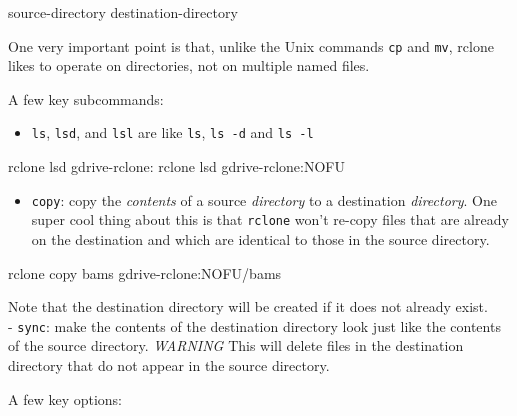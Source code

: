 \documentclass[]{krantz}
\makeatletter
\newenvironment{Shaded}{\begin{snugshade}}{\end{snugshade}}
\newcommand{\ExtensionTok}[1]{#1}
\newcommand{\NormalTok}[1]{#1}
\providecommand{\tightlist}{%
  \setlength{\itemsep}{0pt}\setlength{\parskip}{0pt}}
\newenvironment{kframe}{%
\medskip{}
\setlength{\fboxsep}{.8em}
 \def\at@end@of@kframe{}%
 \ifinner\ifhmode%
  \def\at@end@of@kframe{\end{minipage}}%
  \begin{minipage}{\columnwidth}%
 \fi\fi%
 \def\FrameCommand##1{\hskip\@totalleftmargin \hskip-\fboxsep
 \colorbox{shadecolor}{##1}\hskip-\fboxsep
     \hskip-\linewidth \hskip-\@totalleftmargin \hskip\columnwidth}%
 \MakeFramed {\advance\hsize-\width
   \@totalleftmargin\z@ \linewidth\hsize
   \@setminipage}}%
 {\par\unskip\endMakeFramed%
 \at@end@of@kframe}
\renewenvironment{Shaded}{\begin{kframe}}{\end{kframe}}
\makeatother
\begin{document}
\begin{Shaded}
\begin{Highlighting}[]
\NormalTok{source-directory  destination-directory}
\end{Highlighting}
\end{Shaded}

One very important point is that, unlike the Unix commands \texttt{cp} and \texttt{mv}, rclone
likes to operate on directories, not on multiple named files.

A few key subcommands:

\begin{itemize}
\tightlist
\item
  \texttt{ls}, \texttt{lsd}, and \texttt{lsl} are like \texttt{ls}, \texttt{ls\ -d} and \texttt{ls\ -l}
\end{itemize}

\begin{Shaded}
\begin{Highlighting}[]
\ExtensionTok{rclone}\NormalTok{  lsd gdrive-rclone:}
\ExtensionTok{rclone}\NormalTok{  lsd gdrive-rclone:NOFU}
\end{Highlighting}
\end{Shaded}

\begin{itemize}
\tightlist
\item
  \texttt{copy}: copy the \emph{contents} of a source \emph{directory} to a destination \emph{directory}. One super cool
  thing about this is that \texttt{rclone} won't re-copy files that are already on the destination and which
  are identical to those in the source directory.
\end{itemize}

\begin{Shaded}
\begin{Highlighting}[]
\ExtensionTok{rclone}\NormalTok{ copy bams gdrive-rclone:NOFU/bams}
\end{Highlighting}
\end{Shaded}

Note that the destination directory will be created if it does not already exist.\\
- \texttt{sync}: make the contents of the destination directory look just like the
contents of the source directory. \emph{WARNING} This will delete files in the destination
directory that do not appear in the source directory.

A few key options:
\end{document}
